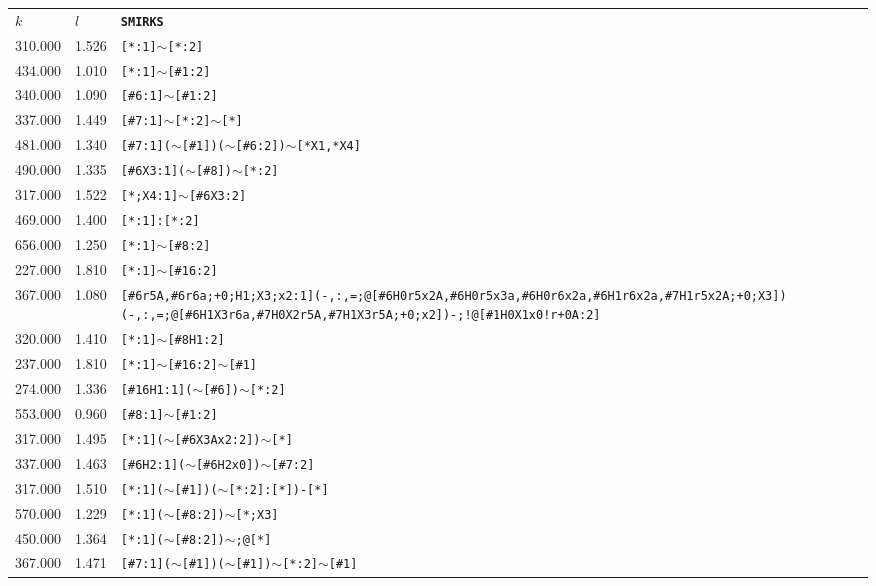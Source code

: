 \begin{longtable}{>{\baselineskip=10pt}p{} >{\baselineskip=10pt}p{} >{\baselineskip=10pt}p{}} 
\hline 
\multicolumn{3}{c}{Bond Parameters} \\ 
\hline 
\textbf{$k$} & \textbf{$l$} & \textbf{\texttt{SMIRKS}} \\ 
\hline 
\endhead310.000 & 1.526 & \texttt{[*:1]$\sim$[*:2]} \\ 
434.000 & 1.010 & \texttt{[*:1]$\sim$[\#1:2]} \\ 
340.000 & 1.090 & \texttt{[\#6:1]$\sim$[\#1:2]} \\ 
337.000 & 1.449 & \texttt{[\#7:1]$\sim$[*:2]$\sim$[*]} \\ 
481.000 & 1.340 & \texttt{[\#7:1]($\sim$[\#1])($\sim$[\#6:2])$\sim$[*X1,*X4]} \\ 
490.000 & 1.335 & \texttt{[\#6X3:1]($\sim$[\#8])$\sim$[*:2]} \\ 
317.000 & 1.522 & \texttt{[*;X4:1]$\sim$[\#6X3:2]} \\ 
469.000 & 1.400 & \texttt{[*:1]:[*:2]} \\ 
656.000 & 1.250 & \texttt{[*:1]$\sim$[\#8:2]} \\ 
227.000 & 1.810 & \texttt{[*:1]$\sim$[\#16:2]} \\ 
367.000 & 1.080 & \texttt{[\#6r5A,\#6r6a;+0;H1;X3;x2:1](-,:,=;@[\#6H0r5x2A,\#6H0r5x3a,\#6H0r6x2a,\#6H1r6x2a,\#7H1r5x2A;+0;X3])(-,:,=;@[\#6H1X3r6a,\#7H0X2r5A,\#7H1X3r5A;+0;x2])-;!@[\#1H0X1x0!r+0A:2]} \\ 
320.000 & 1.410 & \texttt{[*:1]$\sim$[\#8H1:2]} \\ 
237.000 & 1.810 & \texttt{[*:1]$\sim$[\#16:2]$\sim$[\#1]} \\ 
274.000 & 1.336 & \texttt{[\#16H1:1]($\sim$[\#6])$\sim$[*:2]} \\ 
553.000 & 0.960 & \texttt{[\#8:1]$\sim$[\#1:2]} \\ 
317.000 & 1.495 & \texttt{[*:1]($\sim$[\#6X3Ax2:2])$\sim$[*]} \\ 
337.000 & 1.463 & \texttt{[\#6H2:1]($\sim$[\#6H2x0])$\sim$[\#7:2]} \\ 
317.000 & 1.510 & \texttt{[*:1]($\sim$[\#1])($\sim$[*:2]:[*])-[*]} \\ 
570.000 & 1.229 & \texttt{[*:1]($\sim$[\#8:2])$\sim$[*;X3]} \\ 
450.000 & 1.364 & \texttt{[*:1]($\sim$[\#8:2])$\sim$;@[*]} \\ 
367.000 & 1.471 & \texttt{[\#7:1]($\sim$[\#1])($\sim$[\#1])$\sim$[*:2]$\sim$[\#1]} \\ 

\end{longtable}
